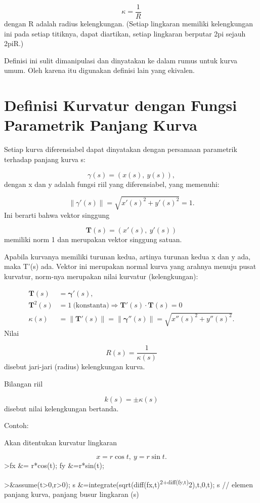 \documentclass[
]{book}
\begin{document}
\[\kappa =\frac {1}{R}\]dengan R adalah radius kelengkungan. (Setiap lingkaran memiliki kelengkungan ini pada setiap titiknya, dapat diartikan, setiap lingkaran berputar 2pi sejauh 2piR.)

Definisi ini sulit dimanipulasi dan dinyatakan ke dalam rumus untuk kurva umum. Oleh karena itu digunakan definisi lain yang ekivalen.

\section{Definisi Kurvatur dengan Fungsi Parametrik Panjang Kurva}\label{definisi-kurvatur-dengan-fungsi-parametrik-panjang-kurva}

Setiap kurva diferensiabel dapat dinyatakan dengan persamaan parametrik terhadap panjang kurva s:

\[\gamma(s) = (x(s),\ y(s)),\]dengan x dan y adalah fungsi riil yang diferensiabel, yang memenuhi:

\[\|\gamma'(s)\|=\sqrt{x'(s)^2+y'(s)^2}=1.\]Ini berarti bahwa vektor singgung

\[\mathbf{T}(s)=(x'(s),\ y'(s))\]memiliki norm 1 dan merupakan vektor singgung satuan.

Apabila kurvanya memiliki turunan kedua, artinya turunan kedua x dan y ada, maka T'(s) ada. Vektor ini merupakan normal kurva yang arahnya menuju pusat kurvatur, norm-nya merupakan nilai kurvatur (kelengkungan):

\[ \begin{aligned}\mathbf{T}(s) &= \mathbf{\gamma}'(s),\\ \mathbf{T}^{2}(s) &=1\ \text{(konstanta)}\Rightarrow \mathbf{T}'(s)\cdot \mathbf{T}(s)=0\\ \kappa(s) &=\|\mathbf {T}'(s)\|= \|\mathbf{\gamma}''(s)\|=\sqrt{x''(s)^{2}+y''(s)^{2}}.\end{aligned}\]Nilai

\[R(s)=\frac{1}{\kappa(s)}\]disebut jari-jari (radius) kelengkungan kurva.

Bilangan riil

\[ k(s) = \pm\kappa(s)\]disebut nilai kelengkungan bertanda.

Contoh:

Akan ditentukan kurvatur lingkaran

\[x=r\cos t,\ y= r\sin t.\]\textgreater fx \&= r*cos(t); fy \&=r*sin(t);

\textgreater\&assume(t\textgreater0,r\textgreater0); s \&=integrate(sqrt(diff(fx,t)\textsuperscript{2+diff(fy,t)}2),t,0,t); s // elemen panjang kurva, panjang busur lingkaran (s)
\end{document}
